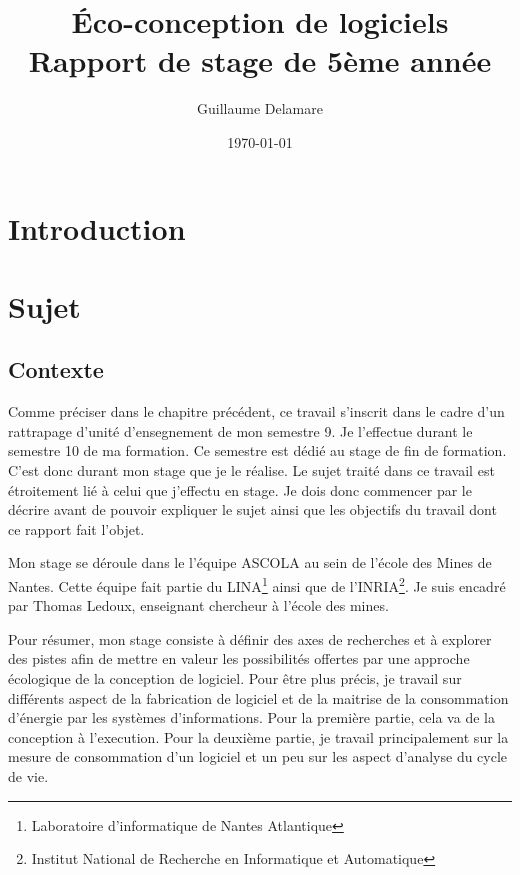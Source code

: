 \documentclass[a4paper, 11pt]{report}
\title{Éco-conception de logiciels\\ \large Rapport de stage de 5ème année}
\author{Guillaume Delamare}
\date{\today}
\begin{document}
\renewcommand{\labelitemi}{$\bullet$}
\renewcommand{\labelitemii}{$\diamond$}
\renewcommand{\labelitemiii}{$\ast$}
\renewcommand{\labelitemiv}{$\cdot$}

\maketitle

\tableofcontents

\chapter{Introduction}

\chapter{Sujet}
	\section{Contexte}
Comme préciser dans le chapitre précédent, ce travail s'inscrit dans le cadre d'un rattrapage d'unité d'ensegnement de mon semestre 9. Je l'effectue durant le semestre 10 de ma formation. Ce semestre est dédié au stage de fin de formation. C'est donc durant mon stage que je le réalise. Le sujet traité dans ce travail est étroitement lié à celui que j'effectu en stage. Je dois donc commencer par le décrire avant de pouvoir expliquer le sujet ainsi que les objectifs du travail dont ce rapport fait l'objet.

Mon stage se déroule dans le l'équipe ASCOLA au sein de l'école des Mines de Nantes. Cette équipe fait partie du LINA\footnote{Laboratoire d'informatique de Nantes Atlantique} ainsi que de l'INRIA\footnote{Institut National de Recherche en Informatique et Automatique}. Je suis encadré par Thomas Ledoux, enseignant chercheur à l'école des mines.

Pour résumer, mon stage consiste à définir des axes de recherches et à explorer des pistes afin de mettre en valeur les possibilités offertes par une approche écologique de la conception de logiciel. Pour être plus précis, je travail sur différents aspect de la fabrication de logiciel et de la maitrise de la consommation d'énergie par les systèmes d'informations. Pour la première partie, cela va de la conception à l'execution. Pour la deuxième partie, je travail principalement sur la mesure de consommation d'un logiciel et un peu sur les aspect d'analyse du cycle de vie.
\end{document}
